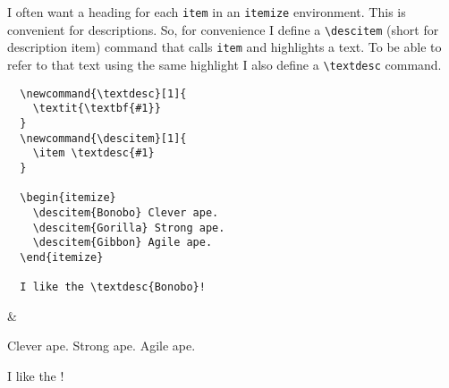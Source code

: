 I often want a heading for each \texttt{item} in an \texttt{itemize} environment. This is convenient for descriptions. So, for convenience I define a \texttt{\textbackslash descitem} (short for description item) command that calls \texttt{item} and highlights a text. To be able to refer to that text using the same highlight I also define a \texttt{\textbackslash textdesc} command.

\begin{latexdemo}
  \begin{verbatim}
  \newcommand{\textdesc}[1]{
    \textit{\textbf{#1}}
  }
  \newcommand{\descitem}[1]{
    \item \textdesc{#1}
  }
  
  \begin{itemize}
    \descitem{Bonobo} Clever ape.
    \descitem{Gorilla} Strong ape.
    \descitem{Gibbon} Agile ape.
  \end{itemize}
  
  I like the \textdesc{Bonobo}!
  \end{verbatim}
  &
  \begin{itemize}
     Clever ape.
     Strong ape.
     Agile ape.
  \end{itemize}
  
  I like the !
\end{latexdemo}

